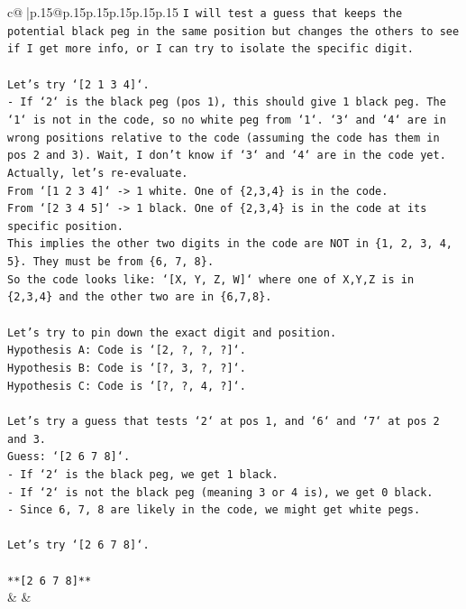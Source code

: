\documentclass{article}
\begin{document}
{\begin{supertabular}{c@{$\;$}|p{.15\linewidth}@{}p{.15\linewidth}p{.15\linewidth}p{.15\linewidth}p{.15\linewidth}p{.15\linewidth}}
{{{\texttt{I will test a guess that keeps the potential black peg in the same position but changes the others to see if I get more info, or I can try to isolate the specific digit.} \\
\\ 
\texttt{Let's try `{[}2 1 3 4{]}`.} \\
\texttt{{-} If `2` is the black peg (pos 1), this should give 1 black peg. The `1` is not in the code, so no white peg from `1`. `3` and `4` are in wrong positions relative to the code (assuming the code has them in pos 2 and 3). Wait, I don't know if `3` and `4` are in the code yet.} \\
\texttt{Actually, let's re{-}evaluate.} \\
\texttt{From `{[}1 2 3 4{]}` {-}> 1 white. One of \{2,3,4\} is in the code.} \\
\texttt{From `{[}2 3 4 5{]}` {-}> 1 black. One of \{2,3,4\} is in the code at its specific position.} \\
\texttt{This implies the other two digits in the code are NOT in \{1, 2, 3, 4, 5\}. They must be from \{6, 7, 8\}.} \\
\texttt{So the code looks like: `{[}X, Y, Z, W{]}` where one of X,Y,Z is in \{2,3,4\} and the other two are in \{6,7,8\}.} \\
\\ 
\texttt{Let's try to pin down the exact digit and position.} \\
\texttt{Hypothesis A: Code is `{[}2, ?, ?, ?{]}`.} \\
\texttt{Hypothesis B: Code is `{[}?, 3, ?, ?{]}`.} \\
\texttt{Hypothesis C: Code is `{[}?, ?, 4, ?{]}`.} \\
\\ 
\texttt{Let's try a guess that tests `2` at pos 1, and `6` and `7` at pos 2 and 3.} \\
\texttt{Guess: `{[}2 6 7 8{]}`.} \\
\texttt{{-} If `2` is the black peg, we get 1 black.} \\
\texttt{{-} If `2` is not the black peg (meaning 3 or 4 is), we get 0 black.} \\
\texttt{{-} Since 6, 7, 8 are likely in the code, we might get white pegs.} \\
\\ 
\texttt{Let's try `{[}2 6 7 8{]}`.} \\
\\ 
\texttt{**{[}2 6 7 8{]}**} \\
            }
        }
    }
    & & \\ \\


\end{supertabular}}
\end{document}
